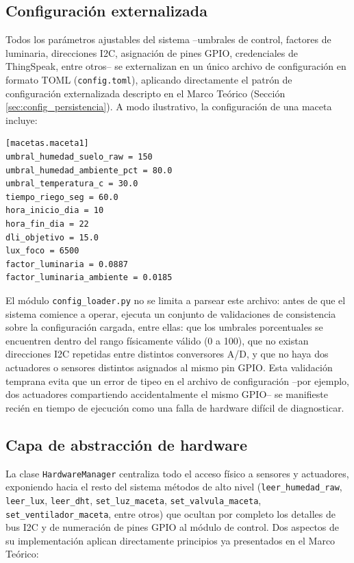 \subsection{Configuración externalizada}
\label{subsec:config_externalizada_real}

Todos los parámetros ajustables del sistema --umbrales de control, factores de luminaria, direcciones I2C, asignación de pines GPIO, credenciales de ThingSpeak, entre otros-- se externalizan en un único archivo de configuración en formato TOML (\texttt{config.toml}), aplicando directamente el patrón de configuración externalizada descripto en el Marco Teórico (Sección \ref{sec:config_persistencia}). A modo ilustrativo, la configuración de una maceta incluye:

\begin{lstlisting}[title={Ejemplo de configuración para una maceta (config.toml)}]
[macetas.maceta1]
umbral_humedad_suelo_raw = 150
umbral_humedad_ambiente_pct = 80.0
umbral_temperatura_c = 30.0
tiempo_riego_seg = 60.0
hora_inicio_dia = 10
hora_fin_dia = 22
dli_objetivo = 15.0
lux_foco = 6500
factor_luminaria = 0.0887
factor_luminaria_ambiente = 0.0185
\end{lstlisting}

El módulo \texttt{config\_loader.py} no se limita a parsear este archivo: antes de que el sistema comience a operar, ejecuta un conjunto de validaciones de consistencia sobre la configuración cargada, entre ellas: que los umbrales porcentuales se encuentren dentro del rango físicamente válido (0 a 100), que no existan direcciones I2C repetidas entre distintos conversores A/D, y que no haya dos actuadores o sensores distintos asignados al mismo pin GPIO. Esta validación temprana evita que un error de tipeo en el archivo de configuración --por ejemplo, dos actuadores compartiendo accidentalmente el mismo GPIO-- se manifieste recién en tiempo de ejecución como una falla de hardware difícil de diagnosticar.

\subsection{Capa de abstracción de hardware}
\label{subsec:capa_hardware_real}

La clase \texttt{HardwareManager} centraliza todo el acceso físico a sensores y actuadores, exponiendo hacia el resto del sistema métodos de alto nivel (\texttt{leer\_humedad\_raw}, \texttt{leer\_lux}, \texttt{leer\_dht}, \texttt{set\_luz\_maceta}, \texttt{set\allowbreak\_valvula\allowbreak\_maceta}, \texttt{set\allowbreak\_ventilador\allowbreak\_maceta}, entre otros) que ocultan por completo los detalles de bus I2C y de numeración de pines GPIO al módulo de control. Dos aspectos de su implementación aplican directamente principios ya presentados en el Marco Teórico:

